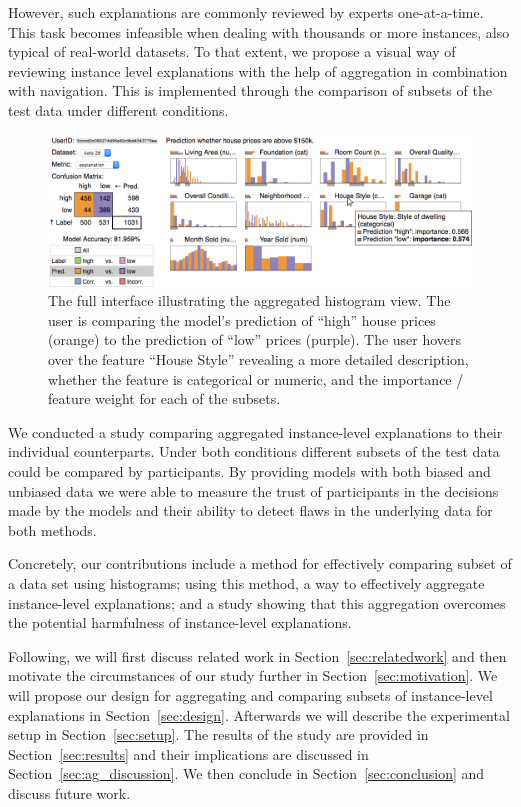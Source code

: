 However, such explanations are commonly reviewed by experts one-at-a-time.
This task becomes infeasible when dealing with thousands or more instances, also typical of real-world datasets.
To that extent, we propose a visual way of reviewing instance level explanations with the help of aggregation in combination with navigation.
This is implemented through the comparison of subsets of the test data under different conditions.

\begin{figure}[ht!]
\centering
\includegraphics[width=0.7\linewidth]{aggexplain/full_histogram}
\caption{
The full interface illustrating the aggregated histogram view.
The user is comparing the model's prediction of ``high'' house prices (orange) to the prediction of ``low'' prices (purple).
The user hovers over the feature ``House Style'' revealing a more detailed description, whether the feature is categorical or numeric, and the importance / feature weight for each of the subsets.
}
\label{figs:full_hist_view}
\end{figure}

We conducted a study comparing aggregated instance-level explanations to their individual counterparts.
Under both conditions different subsets of the test data could be compared by participants.
By providing models with both biased and unbiased data we were able to measure the trust of participants in the decisions made by the models and their ability to detect flaws in the underlying data for both methods.

Concretely, our contributions include a method for effectively comparing subset of a data set using histograms; using this method, a way to effectively aggregate instance-level explanations; and a study showing that this aggregation overcomes the potential harmfulness of instance-level explanations.

Following, we will first discuss related work in Section~\ref{sec:relatedwork} and then motivate the circumstances of our study further in Section~\ref{sec:motivation}.
We will propose our design for aggregating and comparing subsets of instance-level explanations in Section~\ref{sec:design}.
Afterwards we will describe the experimental setup in Section~\ref{sec:setup}.
The results of the study are provided in Section~\ref{sec:results} and their implications are discussed in Section~\ref{sec:ag_discussion}.
We then conclude in Section~\ref{sec:conclusion} and discuss future work.
